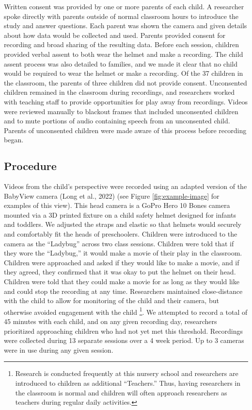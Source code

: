 \documentclass[10pt, letterpaper]{article}
\begin{document}
Written consent was provided by one or more parents of each child. A
researcher spoke directly with parents outside of normal classroom hours
to introduce the study and answer questions. Each parent was shown the
camera and given details about how data would be collected and used.
Parents provided consent for recording and broad sharing of the
resulting data. Before each session, children provided verbal assent to
both wear the helmet and make a recording. The child assent process was
also detailed to families, and we made it clear that no child would be
required to wear the helmet or make a recording. Of the 37 children in
the classroom, the parents of three children did not provide consent.
Unconsented children remained in the classroom during recordings, and
researchers worked with teaching staff to provide opportunities for play
away from recordings. Videos were reviewed manually to blackout frames
that included unconsented children and to mute portions of audio
containing speech from an unconsented child. Parents of unconsented
children were made aware of this process before recording began.

\hypertarget{procedure}{%
\subsection{Procedure}\label{procedure}}

Videos from the child's perspective were recorded using an adapted
version of the BabyView camera (Long et al., 2022) (see Figure
\ref{fig:example-image} for examples of this view). This head camera is
a GoPro Hero 10 Bones camera mounted via a 3D printed fixture on a child
safety helmet designed for infants and toddlers. We adjusted the straps
and elastic so that helmets would securely and comfortably fit the heads
of preschoolers. Children were introduced to the camera as the
``Ladybug'' across two class sessions. Children were told that if they
wore the ``Ladybug,'' it would make a movie of their play in the
classroom. Children were approached and asked if they would like to make
a movie, and if they agreed, they confirmed that it was okay to put the
helmet on their head. Children were told that they could make a movie
for as long as they would like and could stop the recording at any time.
Researchers maintained close-distance with the child to allow for
monitoring of the child and their camera, but otherwise avoided
engagement with the child \footnote{Research is conducted frequently at
  this nursery school and researchers are introduced to children as
  additional ``Teachers.'' Thus, having researchers in the classroom is
  normal and children will often approach researchers as teachers during
  regular daily activities.}. We attempted to record a total of 45
minutes with each child, and on any given recording day, researchers
prioritized approaching children who had not yet met this threshold.
Recordings were collected during 13 separate sessions over a 4 week
period. Up to 3 cameras were in use during any given session.
\end{document}
